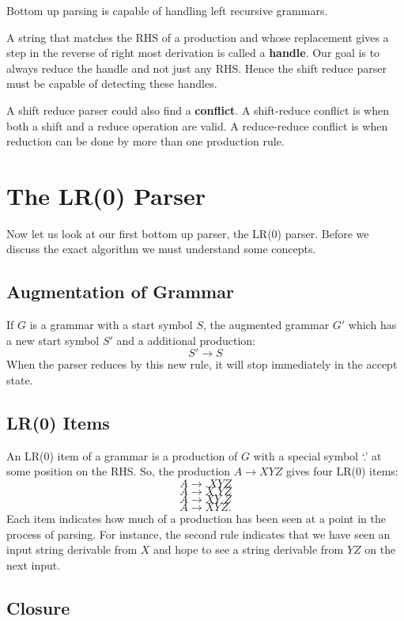 \documentclass[12pt,letterpaper]{amsbook}
\theoremstyle{definition}
\begin{document}
Bottom up parsing is capable of handling left recursive grammars.

A string that matches the RHS of a production and whose replacement gives a step in the reverse of right most derivation is called a \textbf{handle}. Our goal is to always reduce the handle and not just any RHS. Hence the shift reduce parser must be capable of detecting these handles.

A shift reduce parser could also find a \textbf{conflict}. A shift-reduce conflict is when both a shift and a reduce operation are valid. A reduce-reduce conflict is when reduction can be done by more than one production rule.

\section{The LR(0) Parser}

Now let us look at our first bottom up parser, the LR(0) parser. Before we discuss the exact algorithm we must understand some concepts. 

\subsection{Augmentation of Grammar}

If $G$ is a grammar with a start symbol $S$, the augmented grammar $G'$ which has a new start symbol $S'$ and a additional production:
\[S' \rightarrow S\]
When the parser reduces by this new rule, it will stop immediately in the accept state.

\subsection{LR(0) Items}

An LR(0) item of a grammar is a production of $G$ with a special symbol `.' at some position on the RHS. So, the production $A \rightarrow XYZ$ gives four LR(0) items:
\[A \rightarrow .XYZ\]
\[A \rightarrow X.YZ\]
\[A \rightarrow XY.Z\]
\[A \rightarrow XYZ.\]
Each item indicates how much of a production has been seen at a point in the process of parsing. For instance, the second rule indicates that we have seen an input string derivable from $X$ and hope to see a string derivable from $YZ$ on the next input.

\subsection{Closure}
\end{document}
